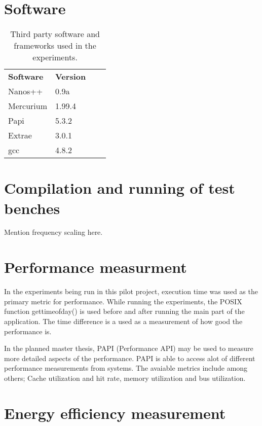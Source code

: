 
\section{Software}
\begin{table}[h]
  \begin{tabular}{llll}
    \textbf{Software} & \textbf{Version}  \\
    Nanos++           & 0.9a              \\
    Mercurium         & 1.99.4            \\
    Papi              & 5.3.2             \\
    Extrae            & 3.0.1             \\
    gcc               & 4.8.2             
  \end{tabular}
  \caption{Third party software and frameworks used in the experiments.\label{overflow}}
\end{table}


\section{Compilation and running of test benches}
Mention frequency scaling here.

\section{Performance measurment}
In the experiments being run in this pilot project, execution time was used as the primary metric for performance.
While running the experiments, the POSIX function gettimeofday() is used before and after running the main part of the application.
The time difference is a used as a measurement of how good the performance is.

In the planned master thesis, PAPI (Performance API) may be used to measure more detailed aspects of the performance.
PAPI is able to access alot of different performance measurements from systems.
The avaiable metrics include among others; Cache utilization and hit rate, memory utilization and bus utilization.

\section{Energy efficiency measurement}

